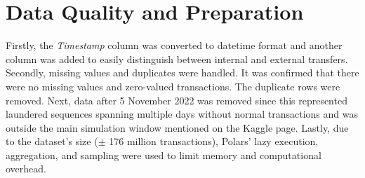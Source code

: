 \section{Data Quality and Preparation}

Firstly, the \emph{Timestamp} column was converted to datetime format and another column was added to easily distinguish between internal and external transfers. Secondly, missing values and duplicates were handled. It was confirmed that there were no
missing values and zero-valued transactions. The duplicate rows were removed. Next, data after 5 November 2022 was removed since this represented laundered sequences spanning multiple days without normal transactions and was outside the main simulation window mentioned on the Kaggle page. Lastly, due to the dataset's size ($\pm$ 176 million transactions), Polars' lazy execution, aggregation, and sampling were used to limit memory and computational overhead.